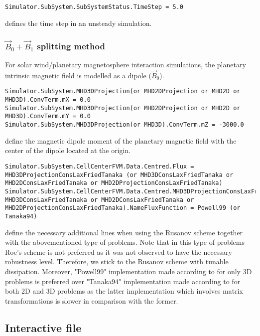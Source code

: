 \documentclass[11pt]{article}
\begin{document}
\begin{lstlisting}[breaklines]
Simulator.SubSystem.SubSystemStatus.TimeStep = 5.0
\end{lstlisting}
defines the time step in an unsteady simulation.

\subsubsection{$\vec{B}_0+\vec{B}_1$ splitting method}

For solar wind/planetary magnetosphere interaction simulations, the planetary intrinsic magnetic field is modelled as a dipole ($\vec{B}_0$).

\begin{lstlisting}[breaklines]
Simulator.SubSystem.MHD3DProjection(or MHD2DProjection or MHD2D or MHD3D).ConvTerm.mX = 0.0
Simulator.SubSystem.MHD3DProjection(or MHD2DProjection or MHD2D or MHD3D).ConvTerm.mY = 0.0
Simulator.SubSystem.MHD3DProjection(or MHD3D).ConvTerm.mZ = -3000.0
\end{lstlisting}
define the magnetic dipole moment of the planetary magnetic field with the center of the dipole located at the origin.

\begin{lstlisting}[breaklines]
Simulator.SubSystem.CellCenterFVM.Data.Centred.Flux = MHD3DProjectionConsLaxFriedTanaka (or MHD3DConsLaxFriedTanaka or MHD2DConsLaxFriedTanaka or MHD2DProjectionConsLaxFriedTanaka)
Simulator.SubSystem.CellCenterFVM.Data.Centred.MHD3DProjectionConsLaxFriedTanaka(or MHD3DConsLaxFriedTanaka or MHD2DConsLaxFriedTanaka or MHD2DProjectionConsLaxFriedTanaka).NameFluxFunction = Powell99 (or Tanaka94)
\end{lstlisting}
define the necessary additional lines when using the Rusanov scheme together with the abovementioned type of problems. Note that in this type of problems Roe's scheme is not preferred as it was not observed to have the necessary robustness level. Therefore, we stick to the Rusanov scheme with tunable dissipation. Moreover, "Powell99" implementation made according to \cite{powell99} for only 3D problems is preferred over "Tanaka94" implementation made according to \cite{tanaka94} for both 2D and 3D problems as the latter implementation which involves matrix transformations is slower in comparison with the former. 

\subsection{Interactive file}
\end{document}
